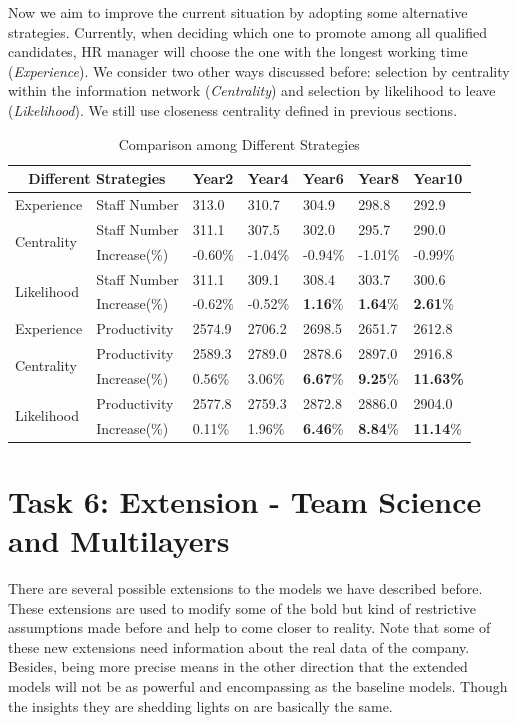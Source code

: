 \documentclass[tcn = 37075, sheet = false, abstract = false]{mcmthesis}
\begin{document}
Now we aim to improve the current situation by adopting some alternative strategies. Currently, when deciding which one to promote among all qualified candidates, HR manager will choose the one with the longest working time (\textit{Experience}). We consider two other ways discussed before: selection by centrality within the information network (\textit{Centrality}) and selection by likelihood to leave (\textit{Likelihood}). We still use closeness centrality defined in previous sections.

\begin{table}[h]
\centering
\begin{tabular}{lllllll}
\hline
\multicolumn{2}{c}{Different Strategies}     & Year2   & Year4   & Year6   & Year8   & Year10  \\ \hline
Experience                  & Staff Number & 313.0   & 310.7   & 304.9   & 298.8   & 292.9   \\
\multirow{2}{*}{Centrality} & Staff Number & 311.1   & 307.5   & 302.0   & 295.7   & 290.0   \\
                            & Increase(\%) & -0.60\% & -1.04\% & -0.94\% & -1.01\% & -0.99\% \\
\multirow{2}{*}{Likelihood} & Staff Number & 311.1   & 309.1   & 308.4   & 303.7   & 300.6   \\
                            & Increase(\%) & -0.62\% & -0.52\% & \textbf{1.16}\%  &\textbf{1.64}\%  & \textbf{2.61}\%  \\ \hline
Experience                  & Productivity & 2574.9  & 2706.2  & 2698.5  & 2651.7  & 2612.8  \\
\multirow{2}{*}{Centrality} & Productivity & 2589.3  & 2789.0  & 2878.6  & 2897.0  & 2916.8  \\
                            & Increase(\%) & 0.56\%  & 3.06\%  & \textbf{6.67}\%  & \textbf{9.25}\%  & \textbf{11.63\%} \\
\multirow{2}{*}{Likelihood} & Productivity & 2577.8  & 2759.3  & 2872.8  & 2886.0  & 2904.0  \\
                            & Increase(\%) & 0.11\%  & 1.96\%  & \textbf{6.46}\%  & \textbf{8.84}\%  & \textbf{11.14}\% \\ \hline
\end{tabular}
\caption{Comparison among Different Strategies}
\end{table}

\section{Task 6: Extension - Team Science and Multilayers}
There are several possible extensions to the models we have described before. These extensions are used to modify some of the bold but kind of restrictive assumptions made before and help to come closer to reality. Note that some of these new extensions need information about the real data of the company. Besides, being more precise means in the other direction that the extended models will not be as powerful and encompassing as the baseline models. Though the insights they are shedding lights on are basically the same.
\end{document}
